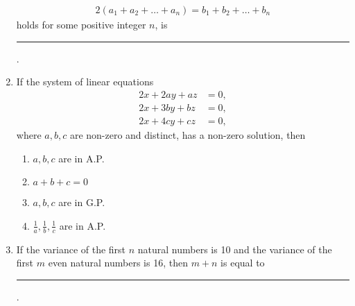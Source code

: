 \begin{enumerate}[label=\thesubsection.\arabic*,ref=\thesubsection.\theenumi]
\begin{align*}
     2(a_1 + a_2 + \dots + a_n) = b_1 + b_2 + \dots + b_n
\end{align*}
    holds for some positive integer $n$, is \rule{1cm}{0.1pt}.
\hfill {}
\item If the system of linear equations
\begin{align*}
    2x + 2ay + az &= 0, \\
    2x + 3by + bz &= 0, \\
    2x + 4cy + cz &= 0,
\end{align*}
where $a, b, c$ are non-zero and distinct, has a non-zero solution, then
\hfill {}
\begin{multicols}{2}
\begin{enumerate}
    \item $a, b, c$ are in A.P.
    \item $a + b + c = 0$
    \item $a, b, c$ are in G.P.
    \item $\frac{1}{a}, \frac{1}{b}, \frac{1}{c}$ are in A.P.
\end{enumerate}
\end{multicols}
\item If the variance of the first $n$ natural numbers is 10 and the variance of the first $m$ even natural numbers is 16, then $m+n$ is equal to \rule{1cm}{0.1pt}.
\hfill {}
\end{enumerate}


